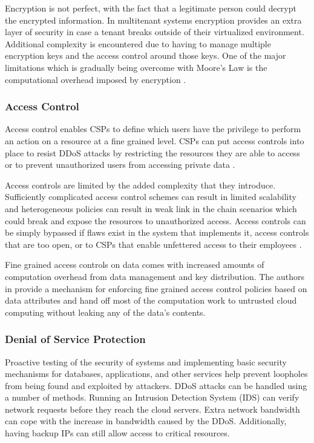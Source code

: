 \documentclass[12pt]{article}
\begin{document}
Encryption is not perfect, with the fact that a legitimate person could decrypt the encrypted information. In multitenant systems encryption provides an extra layer of security in case a tenant breaks outside of their virtualized environment. Additional complexity is encountered due to having to manage multiple encryption keys and the access control around those keys. One of the major limitations which is gradually being overcome with Moore's Law is the computational overhead imposed by encryption \cite{liu2015survey}.

\subsubsection{Access Control}

Access control enables CSPs to define which users have the privilege to perform an action on a resource at a fine grained level. CSPs can put access controls into place to resist DDoS attacks by restricting the resources they are able to access or to prevent unauthorized users from accessing private data \cite{liu2015survey}.

Access controls are limited by the added complexity that they introduce. Sufficiently complicated access control schemes can result in limited scalability and heterogeneous policies can result in weak link in the chain scenarios which could break and expose the resources to unauthorized access. Access controls can be simply bypassed if flaws exist in the system that implements it, access controls that are too open, or to CSPs that enable unfettered access to their employees \cite{kazim2015survey}.

Fine grained access controls on data comes with increased amounts of computation overhead from data management and key distribution. The authors in \cite{yu2010achieving} provide a mechanism for enforcing fine grained access control policies based on data attributes and hand off most of the computation work to untrusted cloud computing without leaking any of the data's contents.



\subsubsection{Denial of Service Protection}


Proactive testing of the security of systems and implementing basic security mechanisms for databases, applications, and other services help prevent loopholes from being found and exploited by attackers. DDoS attacks can be handled using a number of methods. Running an Intrusion Detection System (IDS) can verify network requests before they reach the cloud servers. Extra network bandwidth can cope with the increase in bandwidth caused by the DDoS. Additionally, having backup IPs can still allow access to critical resources.
\end{document}
